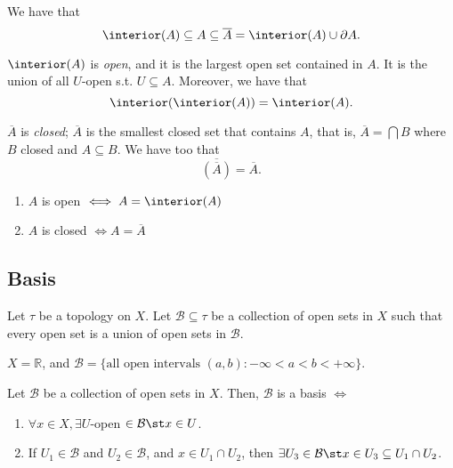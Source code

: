 
\begin{remark}
    We have that $$\interior (A) \subseteq A \subseteq \overline{A} = \interior (A) \cup \partial A.$$
\end{remark}

\begin{proposition}
    $\interior (A)$ is \emph{open}, and it is the largest open set contained in $A$. It is the union of all $U$-open s.t. $U \subseteq A$. Moreover, we have that $$\interior(\interior(A)) = \interior(A).$$
\end{proposition}

\begin{proposition}
    $\overline{A}$ is \emph{closed}; $\overline{A}$ is the smallest closed set that contains $A$, that is, $\overline{A} = \bigcap B$ where $B$ closed and $A \subseteq B$. We have too that \[
    \overline{(\overline{A})} = \overline{A}.    
    \]
\end{proposition}

\begin{proposition}
    \begin{enumerate}
        \item $A$ is open $\iff A = \interior (A)$
        \item $A$ is closed $\iff A = \overline{A}$
    \end{enumerate}
\end{proposition}

\subsection{Basis}
\begin{definition}
    Let $\tau$ be a topology on $X$. Let $\mathcal{B} \subseteq \tau$ be a collection of open sets in $X$ such that every open set is a union of open sets in $\mathcal{B}$.
\end{definition}

\begin{example}
    $X = \mathbb{R}$, and $\mathcal{B} = \{\text{all open intervals } (a, b) : - \infty < a < b < + \infty\}$.
\end{example}

\begin{proposition}\label{prop:basisconsequence}
    Let $\mathcal{B}$ be a collection of open sets in $X$. Then, $\mathcal{B}$ is a basis $\iff$ \begin{enumerate}
        \item $\forall x \in X, \exists U$-open $\in \mathcal{B} \st x \in U$.
        \item If $U_1 \in \mathcal{B}$ and $U_2 \in \mathcal{B}$, and $x \in U_1 \cap U_2$, then $\exists U_3 \in \mathcal{B} \st x \in U_3 \subseteq U_1 \cap U_2$.
    \end{enumerate}
\end{proposition}

